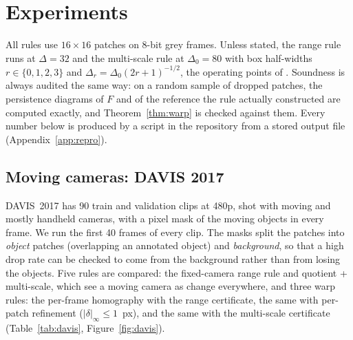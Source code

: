 \section{Experiments}
\label{sec:exp}

All rules use $16{\times}16$ patches on 8-bit grey frames. Unless stated, the range rule runs at $\Delta = 32$ and the multi-scale rule at $\Delta_0 = 80$ with box half-widths $r \in \{0,1,2,3\}$ and $\Delta_r = \Delta_0 (2r+1)^{-1/2}$, the operating points of \citet{nair2026certifiedskip}. Soundness is always audited the same way: on a random sample of dropped patches, the persistence diagrams of $F$ and of the reference the rule actually constructed are computed exactly, and Theorem~\ref{thm:warp} is checked against them. Every number below is produced by a script in the repository from a stored output file (Appendix~\ref{app:repro}).

\subsection{Moving cameras: DAVIS 2017}
\label{sec:davis}

DAVIS~2017 \citep{ponttuset2017davis} has 90 train and validation clips at 480p, shot with moving and mostly handheld cameras, with a pixel mask of the moving objects in every frame. We run the first 40 frames of every clip. The masks split the patches into \emph{object} patches (overlapping an annotated object) and \emph{background}, so that a high drop rate can be checked to come from the background rather than from losing the objects. Five rules are compared: the fixed-camera range rule and quotient + multi-scale, which see a moving camera as change everywhere, and three warp rules: the per-frame homography with the range certificate, the same with per-patch refinement ($|\delta|_\infty \le 1$~px), and the same with the multi-scale certificate (Table~\ref{tab:davis}, Figure~\ref{fig:davis}).

\begin{table}[t]
\centering\scriptsize
\setlength{\tabcolsep}{4pt}

\caption{DAVIS~2017, all 90 clips, first 40 frames each; medians over clips except ``cuts/clip'', which is a mean. ``Revealed'' is the share of patches kept because their area was not yet in the canvas. ``Cuts/clip'' counts frames on which registration failed and the canvas was reset. $\iota$ is the median interpolation term of Proposition~\ref{prop:iota} in grey levels. Times are for the Python prototype with nine clips processed in parallel on one laptop, so they overstate single-stream cost.}
\label{tab:davis}
\end{table}

